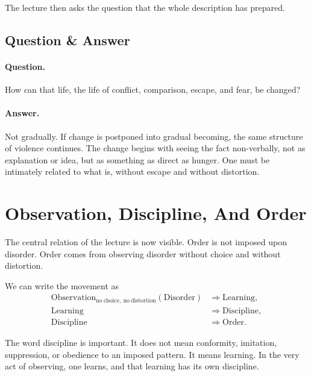 The lecture then asks the question that the whole description has prepared.

\subsection{Question \& Answer}

\paragraph{Question.}
How can that life, the life of conflict, comparison, escape, and fear, be changed?

\paragraph{Answer.}
Not gradually. If change is postponed into gradual becoming, the same structure of violence continues. The change begins with seeing the fact non-verbally, not as explanation or idea, but as something as direct as hunger. One must be intimately related to what is, without escape and without distortion.

\section{Observation, Discipline, And Order}

The central relation of the lecture is now visible. Order is not imposed upon disorder. Order comes from observing disorder without choice and without distortion.

We can write the movement as
\begin{align}
\mathrm{Observation}_{\mathrm{no\ choice,\ no\ distortion}}(\mathrm{Disorder})
&\Rightarrow \mathrm{Learning}, \\
\mathrm{Learning} &\Rightarrow \mathrm{Discipline}, \\
\mathrm{Discipline} &\Rightarrow \mathrm{Order}.
\end{align}

The word discipline is important. It does not mean conformity, imitation, suppression, or obedience to an imposed pattern. It means learning. In the very act of observing, one learns, and that learning has its own discipline.

